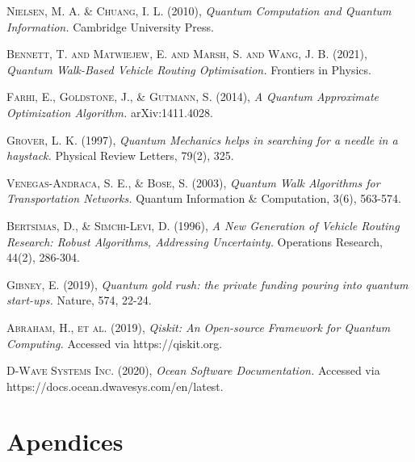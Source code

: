 \documentclass[11pt,a4paper,spanish]{book}
\begin{document}
    \begin{thebibliography}{a}

         \textsc{Nielsen, M. A. \& Chuang, I. L.} (2010),
        \textit{Quantum Computation and Quantum Information.}
        Cambridge University Press.

         \textsc{Bennett, T. and Matwiejew, E. and Marsh, S. and Wang, J. B.} (2021),
        \textit{Quantum Walk-Based Vehicle Routing Optimisation.}
        Frontiers in Physics.

         \textsc{Farhi, E., Goldstone, J., \& Gutmann, S.} (2014),
        \textit{A Quantum Approximate Optimization Algorithm.}
        arXiv:1411.4028.

         \textsc{Grover, L. K.} (1997),
        \textit{Quantum Mechanics helps in searching for a needle in a haystack.}
        Physical Review Letters, 79(2), 325.

         \textsc{Venegas-Andraca, S. E., \& Bose, S.} (2003),
        \textit{Quantum Walk Algorithms for Transportation Networks.}
        Quantum Information \& Computation, 3(6), 563-574.

         \textsc{Bertsimas, D., \& Simchi-Levi, D.} (1996),
        \textit{A New Generation of Vehicle Routing Research: Robust Algorithms, Addressing Uncertainty.}
        Operations Research, 44(2), 286-304.

         \textsc{Gibney, E.} (2019),
        \textit{Quantum gold rush: the private funding pouring into quantum start-ups.}
        Nature, 574, 22-24.

         \textsc{Abraham, H., et al.} (2019),
        \textit{Qiskit: An Open-source Framework for Quantum Computing.}
        Accessed via https://qiskit.org.

         \textsc{D-Wave Systems Inc.} (2020),
        \textit{Ocean Software Documentation.}
        Accessed via https://docs.ocean.dwavesys.com/en/latest.

    \end{thebibliography}

    \appendix
    \chapter{Apendices}
\end{document}
